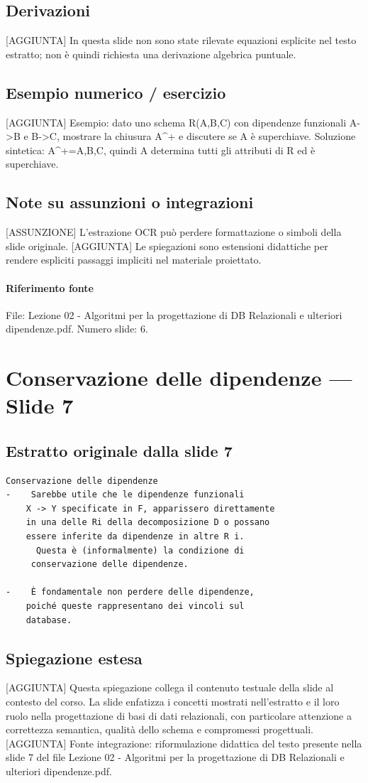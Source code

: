 \documentclass[11pt]{article}
\begin{document}
\subsection*{Derivazioni}
[AGGIUNTA] In questa slide non sono state rilevate equazioni esplicite nel testo estratto; non è quindi richiesta una derivazione algebrica puntuale.
\subsection*{Esempio numerico / esercizio}
[AGGIUNTA] Esempio: dato uno schema R(A,B,C) con dipendenze funzionali A->B e B->C, mostrare la chiusura A^+ e discutere se A è superchiave. Soluzione sintetica: A^+={A,B,C}, quindi A determina tutti gli attributi di R ed è superchiave.
\subsection*{Note su assunzioni o integrazioni}
[ASSUNZIONE] L'estrazione OCR può perdere formattazione o simboli della slide originale.
[AGGIUNTA] Le spiegazioni sono estensioni didattiche per rendere espliciti passaggi impliciti nel materiale proiettato.
\paragraph{Riferimento fonte} File: Lezione 02 - Algoritmi per la progettazione di DB Relazionali e ulteriori dipendenze.pdf. Numero slide: 6.
\section{Conservazione delle dipendenze --- Slide 7}
\subsection*{Estratto originale dalla slide 7}
\begin{lstlisting}
Conservazione delle dipendenze
-    Sarebbe utile che le dipendenze funzionali
    X -> Y specificate in F, apparissero direttamente
    in una delle Ri della decomposizione D o possano
    essere inferite da dipendenze in altre R i.
      Questa è (informalmente) la condizione di
     conservazione delle dipendenze.

-    È fondamentale non perdere delle dipendenze,
    poiché queste rappresentano dei vincoli sul
    database.
\end{lstlisting}
\subsection*{Spiegazione estesa}
[AGGIUNTA] Questa spiegazione collega il contenuto testuale della slide al contesto del corso. La slide enfatizza i concetti mostrati nell'estratto e il loro ruolo nella progettazione di basi di dati relazionali, con particolare attenzione a correttezza semantica, qualità dello schema e compromessi progettuali.
[AGGIUNTA] Fonte integrazione: riformulazione didattica del testo presente nella slide 7 del file Lezione 02 - Algoritmi per la progettazione di DB Relazionali e ulteriori dipendenze.pdf.
\end{document}
